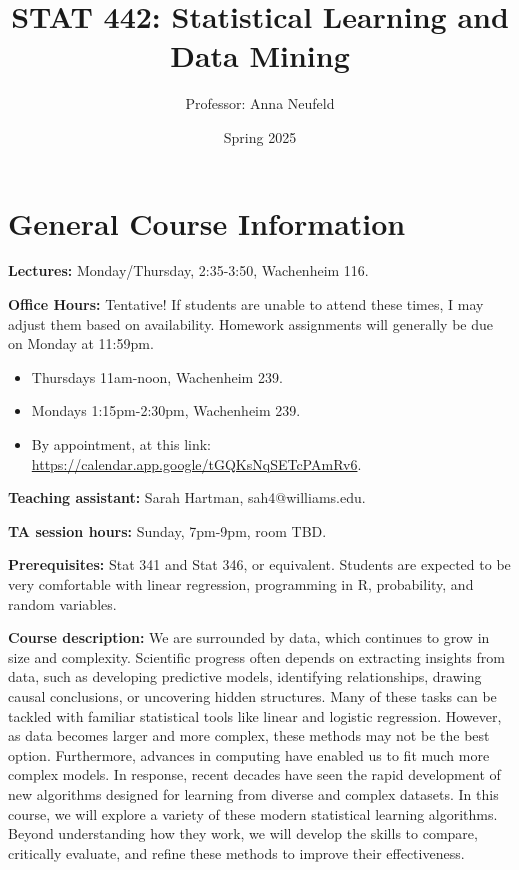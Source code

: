 \documentclass[11pt]{article}
\title{STAT 442: Statistical Learning and Data Mining}
\author{Professor: Anna Neufeld}
\date{Spring 2025}
\begin{document}
\maketitle

\noindent\makebox[\linewidth]{\rule{\textwidth}{0.4pt}}


\section{General Course Information}
\begin{list}{}{}
\item[\textbf{Lectures:}] Monday/Thursday, 2:35-3:50, Wachenheim 116.
\item[\textbf{Office Hours:}]  Tentative! If students are unable to attend these times, I may adjust them based on availability. Homework assignments will generally be due on Monday at 11:59pm. 
\begin{itemize}
\item Thursdays 11am-noon, Wachenheim 239. 
\item Mondays 1:15pm-2:30pm, Wachenheim 239. 
\item By appointment, at this link: \href{https://calendar.app.google/tGQKsNqSETcPAmRv6}{https://calendar.app.google/tGQKsNqSETcPAmRv6}. 
\end{itemize}
\item[\textbf{Teaching assistant:}] Sarah Hartman, sah4@williams.edu.
\item[\textbf{TA session hours:}] Sunday, 7pm-9pm, room TBD. 
\item[\textbf{Prerequisites:}] Stat 341 and Stat 346, or equivalent. Students are expected to be very comfortable with linear regression, programming in R, probability, and random variables.  
 
\item[\textbf{Course description:}] We are surrounded by data, which continues to grow in size and complexity. Scientific progress often depends on extracting insights from data, such as developing predictive models, identifying relationships, drawing causal conclusions, or uncovering hidden structures. Many of these tasks can be tackled with familiar statistical tools like linear and logistic regression. However, as data becomes larger and more complex, these methods may not be the best option. Furthermore, advances in computing have enabled us to fit much more complex models. In response, recent decades have seen the rapid development of new algorithms designed for learning from diverse and complex datasets. In this course, we will explore a variety of these modern statistical learning algorithms. Beyond understanding how they work, we will develop the skills to compare, critically evaluate, and refine these methods to improve their effectiveness. 


\end{list}
\end{document}
